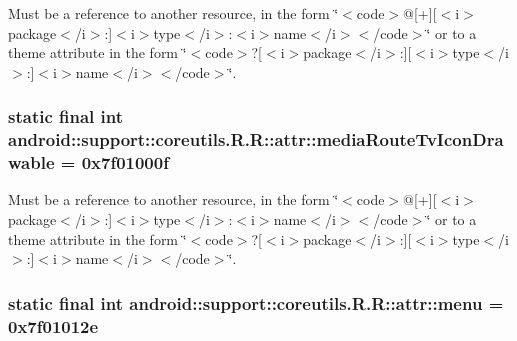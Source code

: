 Must be a reference to another resource, in the form \char`\"{}$<$code$>$@\mbox{[}+\mbox{]}\mbox{[}$<$i$>$package$<$/i$>$:\mbox{]}$<$i$>$type$<$/i$>$:$<$i$>$name$<$/i$>$$<$/code$>$\char`\"{} or to a theme attribute in the form \char`\"{}$<$code$>$?\mbox{[}$<$i$>$package$<$/i$>$:\mbox{]}\mbox{[}$<$i$>$type$<$/i$>$:\mbox{]}$<$i$>$name$<$/i$>$$<$/code$>$\char`\"{}. \hypertarget{classandroid_1_1support_1_1coreutils_1_1_r_1_1attr_50c13111d33a0a4f5e7bcbc6c296fe90}{
\subsubsection[{mediaRouteTvIconDrawable}]{\setlength{\rightskip}{0pt plus 5cm}static final int android::support::coreutils.R.R::attr::mediaRouteTvIconDrawable = 0x7f01000f}}
\label{classandroid_1_1support_1_1coreutils_1_1_r_1_1attr_50c13111d33a0a4f5e7bcbc6c296fe90}


Must be a reference to another resource, in the form \char`\"{}$<$code$>$@\mbox{[}+\mbox{]}\mbox{[}$<$i$>$package$<$/i$>$:\mbox{]}$<$i$>$type$<$/i$>$:$<$i$>$name$<$/i$>$$<$/code$>$\char`\"{} or to a theme attribute in the form \char`\"{}$<$code$>$?\mbox{[}$<$i$>$package$<$/i$>$:\mbox{]}\mbox{[}$<$i$>$type$<$/i$>$:\mbox{]}$<$i$>$name$<$/i$>$$<$/code$>$\char`\"{}. \hypertarget{classandroid_1_1support_1_1coreutils_1_1_r_1_1attr_aad1ce928da7b332ccdc4d185fdebf9f}{
\subsubsection[{menu}]{\setlength{\rightskip}{0pt plus 5cm}static final int android::support::coreutils.R.R::attr::menu = 0x7f01012e}}
\label{classandroid_1_1support_1_1coreutils_1_1_r_1_1attr_aad1ce928da7b332ccdc4d185fdebf9f}


